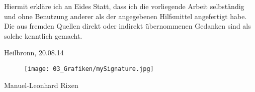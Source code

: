 Hiermit erkläre ich an Eides Statt, dass ich die vorliegende Arbeit selbständig und ohne 
Benutzung anderer als der angegebenen Hilfsmittel angefertigt habe. Die aus fremden 
Quellen direkt oder indirekt übernommenen Gedanken sind als solche kenntlich gemacht. 

Heilbronn, {20.08.14}
\vspace{-0.2cm}
\begin{figure}[H]
	\texttt{[image: 03\_Grafiken/mySignature.jpg]}
\end{figure}
\vspace{-1cm}
Manuel-Leonhard Rixen